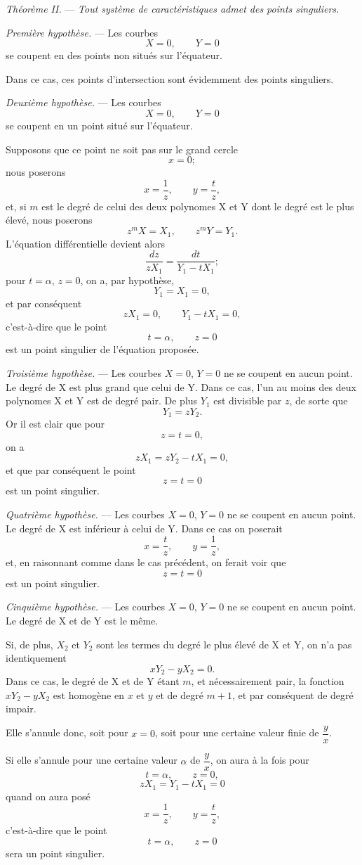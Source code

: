 \documentclass[11pt]{article}
\begin{document}
\emph{Théorème II.} --- \emph{Tout système de caractéristiques admet des points singuliers.}

\emph{Première hypothèse.} --- Les courbes
\[
X=0,\qquad Y=0
\]
se coupent en des points non situés sur l’équateur.

Dans ce cas, ces points d’intersection sont évidemment des points singuliers.

\emph{Deuxième hypothèse.} --- Les courbes
\[
X=0,\qquad Y=0
\]
se coupent en un point situé sur l’équateur.

Supposons que ce point ne soit pas sur le grand cercle
\[
x=0;
\]
nous poserons
\[
x=\frac1z,\qquad y=\frac{t}{z},
\]
et, si $m$ est le degré de celui des deux polynomes X et Y dont le degré est le plus élevé, nous poserons
\[
z^mX=X_1,\qquad z^mY=Y_1.
\]
L’équation différentielle devient alors
\[
\frac{dz}{zX_1}=\frac{dt}{Y_1-tX_1};
\]
pour $t=\alpha$, $z=0$, on a, par hypothèse,
\[
Y_1=X_1=0,
\]
et par conséquent
\[
zX_1=0,\qquad Y_1-tX_1=0,
\]
c’est-à-dire que le point
\[
t=\alpha,\qquad z=0
\]
est un point singulier de l’équation proposée.

\emph{Troisième hypothèse.} --- Les courbes $X=0$, $Y=0$ ne se coupent en aucun point. Le degré de X est plus grand que celui de Y. Dans ce cas, l’un au moins des deux polynomes X et Y est de degré pair. De plus $Y_1$ est divisible par $z$, de sorte que
\[
Y_1=zY_2.
\]
Or il est clair que pour
\[
z=t=0,
\]
on a
\[
zX_1=zY_2-tX_1=0,
\]
et que par conséquent le point
\[
z=t=0
\]
est un point singulier.

\emph{Quatrième hypothèse.} --- Les courbes $X=0$, $Y=0$ ne se coupent en aucun point. Le degré de X est inférieur à celui de Y. Dans ce cas on poserait
\[
x=\frac{t}{z},\qquad y=\frac1z,
\]
et, en raisonnant comme dans le cas précédent, on ferait voir que
\[
z=t=0
\]
est un point singulier.

\emph{Cinquième hypothèse.} --- Les courbes $X=0$, $Y=0$ ne se coupent en aucun point. Le degré de X et de Y est le même.

Si, de plus, $X_2$ et $Y_2$ sont les termes du degré le plus élevé de X et Y, on n’a pas identiquement
\[
xY_2-yX_2=0.
\]
Dans ce cas, le degré de X et de Y étant $m$, et nécessairement pair, la fonction $xY_2-yX_2$ est homogène en $x$ et $y$ et de degré $m+1$, et par conséquent de degré impair.

Elle s’annule donc, soit pour $x=0$, soit pour une certaine valeur finie de $\dfrac yx$.

Si elle s’annule pour une certaine valeur $\alpha$ de $\dfrac yx$, on aura à la fois pour
\[
t=\alpha,\qquad z=0,
\]
\[
zX_1=Y_1-tX_1=0
\]
quand on aura posé
\[
x=\frac1z,\qquad y=\frac{t}{z},
\]
c’est-à-dire que le point
\[
t=\alpha,\qquad z=0
\]
sera un point singulier.
\end{document}
